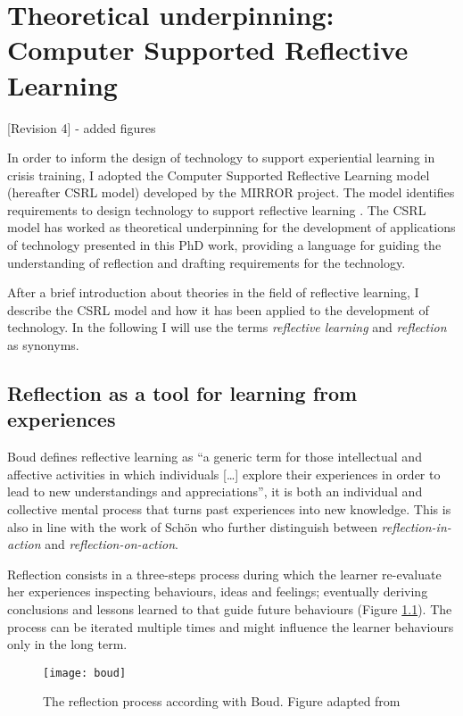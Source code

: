\chapter{Theoretical underpinning: Computer Supported Reflective
Learning}\label{csrl}

{[}Revision 4{]} - added figures

In order to inform the design of technology to support experiential
learning in crisis training, I adopted the Computer Supported Reflective
Learning model (hereafter CSRL model) developed by the MIRROR project.
The model identifies requirements to design technology to support
reflective learning \autocite{Krogstie:2013kf}. The CSRL model has
worked as theoretical underpinning for the development of applications
of technology presented in this PhD work, providing a language for
guiding the understanding of reflection and drafting requirements for
the technology.

After a brief introduction about theories in the field of reflective
learning, I describe the CSRL model and how it has been applied to the
development of technology. In the following I will use the terms
\emph{reflective learning} and \emph{reflection} as synonyms.

\section{Reflection as a tool for learning from
experiences}\label{reflection-as-a-tool-for-learning-from-experiences}

Boud \autocite*{boud1985reflection} defines reflective learning as ``a
generic term for those intellectual and affective activities in which
individuals {[}\ldots{}{]} explore their experiences in order to lead to
new understandings and appreciations'', it is both an individual and
collective mental process that turns past experiences into new
knowledge. This is also in line with the work of Schön
\autocite*{Schon:1983ut} who further distinguish between
\emph{reflection-in-action} and \emph{reflection-on-action}.

Reflection consists in a three-steps process during which the learner
re-evaluate her experiences inspecting behaviours, ideas and feelings;
eventually deriving conclusions and lessons learned to that guide future
behaviours (Figure \ref{fig:boud-model}). The process can be iterated
multiple times and might influence the learner behaviours only in the
long term.

\begin{figure}[htb]
    \centering
    \texttt{[image: boud]}
    \caption{The reflection process according with Boud. Figure adapted from \protect\cite{boud1985reflection}}
    \label{fig:boud-model}
\end{figure}

